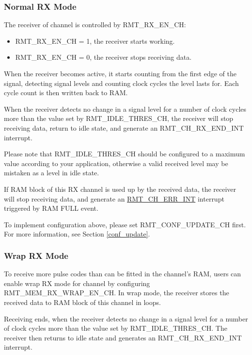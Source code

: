 \documentclass[main\_\_EN.tex]{subfiles}
\begin{document}
\subsubsection{Normal RX Mode}

The receiver of channel  is controlled by RMT\_RX\_EN\_CH:
\begin{itemize}
    \item RMT\_RX\_EN\_CH = 1, the receiver starts working.
    \item RMT\_RX\_EN\_CH = 0, the receiver stops receiving data.
\end{itemize}

When the receiver becomes active, it starts counting from the first edge of the signal, detecting signal levels and counting clock cycles the level lasts for. Each cycle count is then written back to RAM. 

When the receiver detects no change in a signal level for a number of clock cycles more than the value set by RMT\_IDLE\_THRES\_CH, the receiver will stop receiving data, return to idle state, and generate an RMT\_CH\_RX\_END\_INT interrupt.

Please note that RMT\_IDLE\_THRES\_CH should be configured to a maximum value according to your application, otherwise a valid received level may be mistaken as a level in idle state.

If RAM block of this RX channel is used up by the received data, the receiver will stop receiving data, and generate an  \hyperref[int:RMTCHnERRINT]{RMT\_CH\_ERR\_INT} interrupt triggered by RAM FULL event.

To implement configuration above, please set RMT\_CONF\_UPDATE\_CH first. For more information, see Section \ref{conf_update}.

\subsubsection{Wrap RX Mode}

To receive more pulse codes than can be fitted in the channel's RAM, users can enable wrap RX mode for channel  by configuring RMT\_MEM\_RX\_WRAP\_EN\_CH. In wrap mode, the receiver stores the received data to RAM block of this channel in loops. 

Receiving ends, when the receiver detects no change in a signal level for a number of clock cycles more than the value set by RMT\_IDLE\_THRES\_CH. The receiver then returns to idle state and generates an RMT\_CH\_RX\_END\_INT interrupt. 
\end{document}
